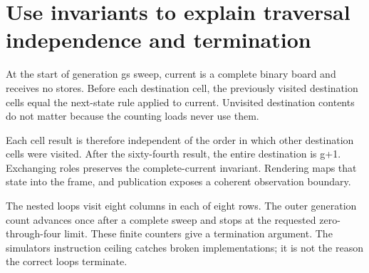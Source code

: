 \section{Use invariants to explain traversal independence and
  termination}\label{008-life-generations-p10-use-invariants-to-explain-traversal-independence-and-termination}

At the start of generation g\textquotesingle s sweep, current is a
complete binary board and receives no stores. Before each destination
cell, the previously visited destination cells equal the next-state rule
applied to current. Unvisited destination contents do not matter because
the counting loads never use them.

Each cell result is therefore independent of the order in which other
destination cells were visited. After the sixty-fourth result, the
entire destination is g+1. Exchanging roles preserves the
complete-current invariant. Rendering maps that state into the frame,
and publication exposes a coherent observation boundary.

The nested loops visit eight columns in each of eight rows. The outer
generation count advances once after a complete sweep and stops at the
requested zero-through-four limit. These finite counters give a
termination argument. The simulator\textquotesingle s instruction
ceiling catches broken implementations; it is not the reason the correct
loops terminate.
